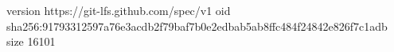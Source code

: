version https://git-lfs.github.com/spec/v1
oid sha256:91793312597a76e3acdb2f79baf7b0e2edbab5ab8ffc484f24842e826f7c1adb
size 16101
